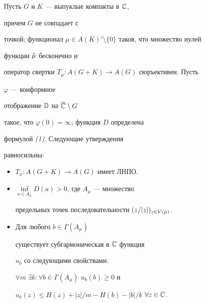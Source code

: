 \begin{thm} Пусть $G$ и $K$ --- выпуклые компакты в $\Bbb C$, 


причем $G$ не совпадает с 


точкой; функционал $\mu\in A(K)'\setminus\{0\}$ таков, что множество нулей 


функции $\Hat\mu$ бесконечно и 


оператор свертки $T_\mu :A(G+K)\to A(G)$ сюръективен. Пусть 


$\varphi$ --- конформное 


отображение $\Bbb D$ на $\overline{\Bbb C}\setminus G$ 


такое, что $\varphi(0)=\infty$; функция $D$ определена 


формулой {\em (1).} Следующие утверждения 


равносильны: 


\begin{itemize} 


\item[а)] $T_\mu :A(G+K)\to A(G)$ имеет ЛНПО. 


\item[б)] $\inf\limits_{a\in A_\mu}D(a)>0$, где $A_\mu$ --- множество 


предельных точек последовательности $(z/|z|)_{z\in V(\Hat\mu)}$. 


\item[в)] Для любого $b\in\Gamma(A_\mu)$ 


существует субгармоническая в $\Bbb C$ функция 


$u_b$ со следующими свойствами: 


$\forall m\;\exists k:\forall b\in\Gamma(A_\mu)$ $u_b(b)\ge 0$ и 


$u_b(z)\le H(z)+|z|/m-H(b)-|b|/k$ $\forall z\in\Bbb C$. 


\end{itemize} 


\end{thm} 


 


